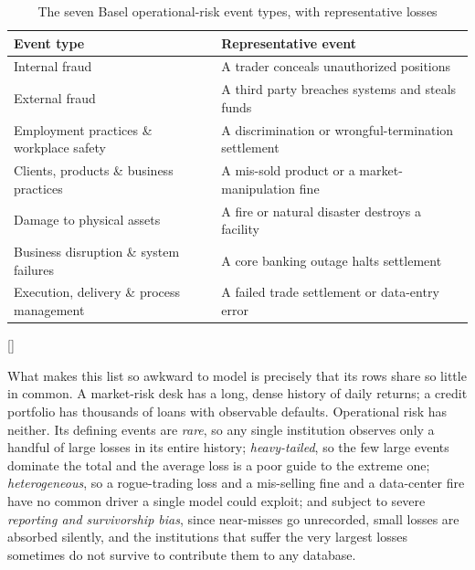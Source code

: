 \documentclass[../ai_in_finance]{subfiles}
\begin{document}
\begin{table}[htbp]
\centering
\begin{lrbox}{\bookmeasuredbox}
\begin{tabular}{p{6.0cm}p{7.6cm}}
\toprule
Event type & Representative event \\
\midrule
Internal fraud & A trader conceals unauthorized positions \\
External fraud & A third party breaches systems and steals funds \\
Employment practices \& workplace safety & A discrimination or wrongful-termination settlement \\
Clients, products \& business practices & A mis-sold product or a market-manipulation fine \\
Damage to physical assets & A fire or natural disaster destroys a facility \\
Business disruption \& system failures & A core banking outage halts settlement \\
Execution, delivery \& process management & A failed trade settlement or data-entry error \\
\bottomrule
\end{tabular}
\end{lrbox}
\ifdim\wd\bookmeasuredbox<0.65\linewidth
\setlength{\bookcapwidth}{0.65\linewidth}
\else
\setlength{\bookcapwidth}{\wd\bookmeasuredbox}
\fi
{}[\bookcapwidth]{
\usebox{\bookmeasuredbox}
}{
\caption{The seven Basel operational-risk event types, with representative losses}
\label{tab:oprisk-event-types}
}
\end{table}

What makes this list so awkward to model is precisely that its rows share so little in common. A market-risk desk has a long, dense history of daily returns; a credit portfolio has thousands of loans with observable defaults. Operational risk has neither. Its defining events are \emph{rare}, so any single institution observes only a handful of large losses in its entire history; \emph{heavy-tailed}, so the few large events dominate the total and the average loss is a poor guide to the extreme one; \emph{heterogeneous}, so a rogue-trading loss and a mis-selling fine and a data-center fire have no common driver a single model could exploit; and subject to severe \emph{reporting and survivorship bias}, since near-misses go unrecorded, small losses are absorbed silently, and the institutions that suffer the very largest losses sometimes do not survive to contribute them to any database.
\end{document}
